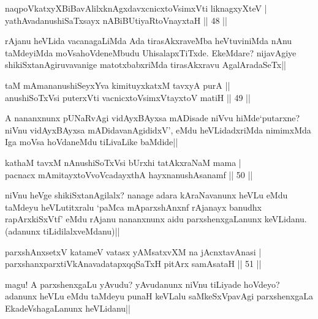 \begin{shl}
naqpoVkatxyXBiBavAlilxknAgxdavxcnicxtoV\s simxVti liknagxyXteV | \\
yathAvadanushiSaTxsayx nABiBUtiyaRtoV\s nayxtaH \hfill|| 48 || 
\end{shl}

\begin{artha}
rAjanu heVLida vacanagaLiMda Ada tirasAkxraveMba heVtuviniMda 
nAnu taMdeyiMda moVsahoVdeneMbudu UhisalapxTiTxde. EkeMdare? 
nijavAgiye shikiSxtanAgiruvavanige matotxbabxriMda tirasAkxravu 
AgalAradaSeTx|| 
\end{artha}


\begin{shl}
taM mAmananushiSeyxYva kimituyxkatxM tavxyA purA || \\
anushiSoTxV\s si puterxVti vacnicxtoV\s simxVtayxtoV matiH \hfill|| 49 || 
\end{shl}

\begin{artha}
A nananxnunx pUNaRvAgi vidAyxBAyxsa mADisade niVvu hiMde`putarxne? 
niVnu vidAyxBAyxsa mADidavanAgididxV', eMdu heVLidadxriMda nimimxMda 
Iga moVsa hoVdaneMdu tiLivaLike baMdide||
\end{artha}

\begin{shl}
kathaM tavxM nAnushiSoTxV\s si bUrxhi tatAkxraNaM mama | \\
pacnacx mAmitayxtoV\s voVcadayxthA hayxnanushAsanamf \hfill|| 50 || 
\end{shl}

\begin{artha}
niVnu heVge shikiSxtanAgilalx? nanage adara kAraNavanunx heVLu eMdu 
taMdeyu heVLutitxralu `paMca mAparxshAnxnf rAjanayx banudhx 
rapArxkiSxVtf' eMdu rAjanu nananxnunx aidu parxshenxgaLanunx 
keVLidanu. (adanunx tiLidilalxveMdanu)||
\end{artha}

\begin{shl}
parxshAnxsetxV katameV vatasx yAMsatxvXM na jAcnxtavAnasi | \\
parxshanxparxtiVkAnavadatapxqqSaTxH pitArx samAsataH \hfill|| 51 || 
\end{shl}

\begin{artha}
magu! A parxshenxgaLu yAvudu? yAvudanunx niVnu tiLiyade hoVdeyo? 
adanunx heVLu eMdu taMdeyu punaH keVLalu saMkeSxVpavAgi parxshenxgaLa 
EkadeVshagaLanunx heVLidanu||
\end{artha}

